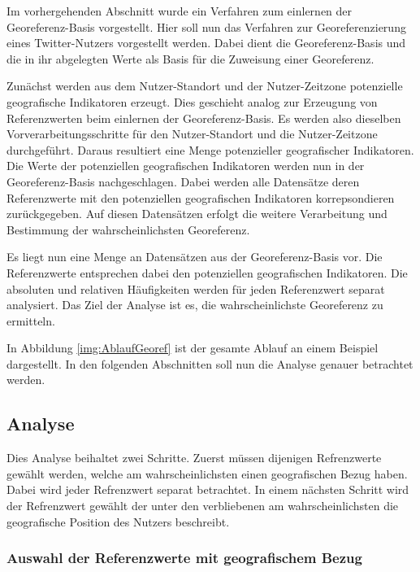 		Im vorhergehenden Abschnitt wurde ein Verfahren zum einlernen der Georeferenz-Basis vorgestellt. 
		Hier soll nun das Verfahren zur Georeferenzierung eines Twitter-Nutzers vorgestellt werden.
		Dabei dient die Georeferenz-Basis und die in ihr abgelegten Werte als Basis für die Zuweisung einer Georeferenz.

		Zunächst werden aus dem Nutzer-Standort und der Nutzer-Zeitzone potenzielle geografische Indikatoren erzeugt.
		Dies geschieht analog zur Erzeugung von Referenzwerten beim einlernen der Georeferenz-Basis.
		Es werden also dieselben Vorverarbeitungsschritte für den Nutzer-Standort und die Nutzer-Zeitzone durchgeführt.
		Daraus resultiert eine Menge potenzieller geografischer Indikatoren.
		Die Werte der potenziellen geografischen Indikatoren werden nun in der Georeferenz-Basis nachgeschlagen. 
		Dabei werden alle Datensätze deren Referenzwerte mit den potenziellen geografischen Indikatoren korrepsondieren zurückgegeben.
		Auf diesen Datensätzen erfolgt die weitere Verarbeitung und Bestimmung der wahrscheinlichsten Georeferenz.
		
		Es liegt nun eine Menge an Datensätzen aus der Georeferenz-Basis vor.
		Die Referenzwerte entsprechen dabei den potenziellen geografischen Indikatoren.
		Die absoluten und relativen Häufigkeiten werden für jeden Referenzwert separat analysiert.
		Das Ziel der Analyse ist es, die wahrscheinlichste Georeferenz zu ermitteln.

		In Abbildung \ref{img:AblaufGeoref} ist der gesamte Ablauf an einem Beispiel dargestellt.
		In den folgenden Abschnitten soll nun die Analyse genauer betrachtet werden.

		\subsection{Analyse}

			Dies Analyse beihaltet zwei Schritte. 
			Zuerst müssen dijenigen Refrenzwerte gewählt werden, welche am wahrscheinlichsten einen geografischen Bezug haben.
			Dabei wird jeder Refrenzwert separat betrachtet. 
			In einem nächsten Schritt wird der Refrenzwert gewählt der unter den verbliebenen am wahrscheinlichsten die geografische Position des Nutzers beschreibt. 

			\subsubsection{Auswahl der Referenzwerte mit geografischem Bezug}

